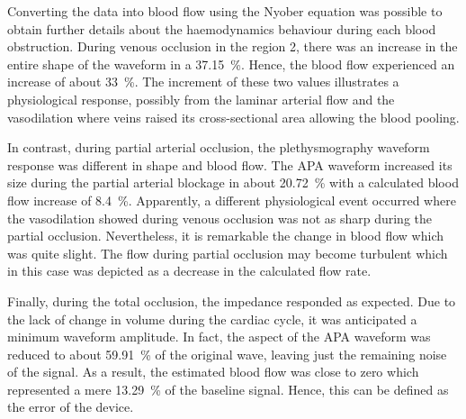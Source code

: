Converting the data into blood flow using the Nyober equation was possible to obtain further details about the haemodynamics behaviour during each blood obstruction. During venous occlusion in the region 2, there was an increase in the entire shape of the waveform in a \SI{37.15}{\percent}. Hence, the blood flow experienced an increase of about \SI{33}{\percent}. The increment of these two values illustrates a physiological response, possibly from the laminar arterial flow and the vasodilation where veins raised its cross-sectional area allowing the blood pooling. 

In contrast, during partial arterial occlusion, the plethysmography waveform response was different in shape and blood flow.  The APA waveform increased its size during the partial arterial blockage in about \SI{20.72}{\percent} with a calculated blood flow increase of \SI{8.4}{\percent}. Apparently, a different physiological event occurred where the vasodilation showed during venous occlusion was not as sharp during the partial occlusion. Nevertheless, it is remarkable the change in blood flow which was quite slight. The flow during partial occlusion may become turbulent which in this case was depicted as a decrease in the calculated flow rate. 

Finally, during the total occlusion, the impedance responded as expected. Due to the lack of change in volume during the cardiac cycle, it was anticipated a minimum waveform amplitude.  In fact, the aspect of the APA waveform was reduced to about \SI{59.91}{\percent} of the original wave, leaving just the remaining noise of the signal. As a result, the estimated blood flow was close to zero which represented a mere \SI{13.29}{\percent} of the baseline signal. Hence, this can be defined as the error of the device.

